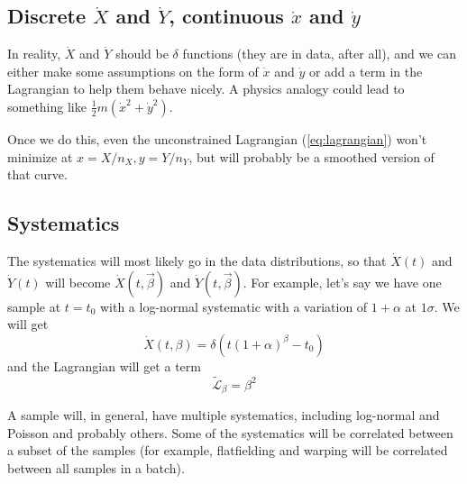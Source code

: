 \documentclass[11pt]{article}
\newcommand{\xdot}{\dot{x}}
\newcommand{\ydot}{\dot{y}}
\newcommand{\Xdot}{\dot{X}}
\newcommand{\Ydot}{\dot{Y}}
\begin{document}
\subsection{Discrete \texorpdfstring{\(\Xdot\)}{Xdot} and \texorpdfstring{\(\Ydot\)}{Ydot}, continuous \texorpdfstring{\(\xdot\)}{xdot} and \texorpdfstring{\(\ydot\)}{ydot}}
In reality, \(\Xdot\) and \(\Ydot\) should be \(\delta\) functions (they are in data, after all), and we can either make some assumptions on the form of \(\xdot\) and \(\ydot\) or add a term in the Lagrangian to help them behave nicely.  A physics analogy could lead to something like \(\frac{1}{2}m(\xdot^2+\ydot^2)\).

Once we do this, even the unconstrained Lagrangian (\cref{eq:lagrangian}) won't minimize at \(x=X/n_X, y=Y/n_Y\), but will probably be a smoothed version of that curve.

\subsection{Systematics}\label{sec:systematics}

The systematics will most likely go in the data distributions, so that \(\Xdot(t)\) and \(\Ydot(t)\) will become \(\Xdot(t,\vec{\beta})\) and \(\Ydot(t,\vec{\beta})\).  For example, let's say we have one sample at \(t=t_0\) with a log-normal systematic with a variation of \(1+\alpha\) at \(1\sigma\).  We will get
\begin{equation}
\Xdot(t,\beta)=\delta(t(1+\alpha)^{\beta}-t_0)
\end{equation}
and the Lagrangian will get a term
\begin{equation}
\mathcal{\tilde{L}_\beta}=\beta^2
\end{equation}

A sample will, in general, have multiple systematics, including log-normal and Poisson and probably others.  Some of the systematics will be correlated between a subset of the samples (for example, flatfielding and warping will be correlated between all samples in a batch).

\printbibliography
\end{document}
